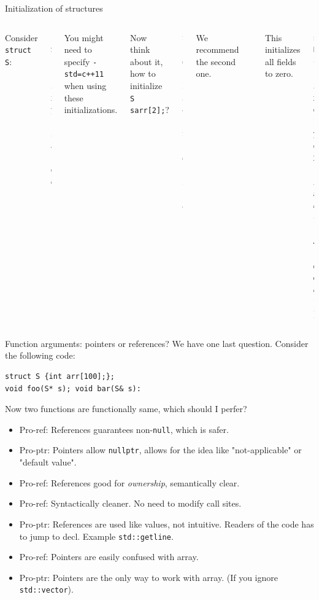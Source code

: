 \begin{frame}[fragile]{Initialization of structures}

\begin{columns}
	Consider \texttt{struct S}:
\begin{verbatim}
struct S {
    int x, y;
    int arr[2];
    double d;
};
\end{verbatim}
You might need to specify \texttt{-std=c++11} when using these initializations.

Now think about it, how to initialize \texttt{S sarr[2];}?

\begin{verbatim}
S s1 = {1, 2, 3, 4, 1.0};
S s2 = {1, 2, {3, 4}, 1.0};
\end{verbatim}
We recommend the second one.
	
\begin{verbatim}
S s1{};
\end{verbatim}
This initializes all fields to zero.

\begin{verbatim}
struct P {
    int x = 1, y = 2;  
    int arr[2] = {3 , 4}; 
    double d = 1.0;
};
\end{verbatim}
\end{columns}
\end{frame}

\begin{frame}[fragile]{Function arguments: pointers or references?}
We have one last question. Consider the following code:
\begin{verbatim}
struct S {int arr[100];};
void foo(S* s); void bar(S& s):
\end{verbatim}
Now two functions are functionally same, which should I perfer?

\begin{itemize}
	\item Pro-ref: References guarantees non-\texttt{null}, which is safer.
	\item Pro-ptr: Pointers allow \texttt{nullptr}, allows for the idea like "not-applicable" or "default value".
	\item Pro-ref: References good for \textit{ownership}, semantically clear.
	\item Pro-ref: Syntactically cleaner. No need to modify call sites.
	\item Pro-ptr: References are used like values, not intuitive. Readers of the code has to jump to decl. Example \texttt{std::getline}.
	\item Pro-ref: Pointers are easily confused with array.
	\item Pro-ptr: Pointers are the only way to work with array. (If you ignore \texttt{std::vector}).
\end{itemize}
\end{frame}

